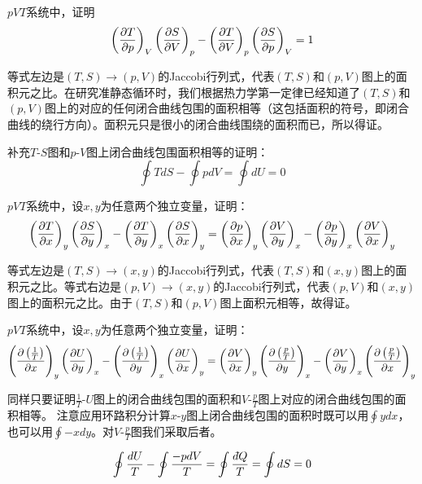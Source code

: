 \documentclass[CJK]{beamer}
\begin{document}
\begin{frame}
  \bch
  $pVT$系统中，证明
  $$ \left(\frac{\partial T}{\partial p}\right)_{V} \left(\frac{\partial S}{\partial V}\right)_{p} - \left(\frac{\partial T}{\partial V}\right)_{p} \left(\frac{\partial S}{\partial p}\right)_{V} = 1 $$
  \ech
\end{frame}

\begin{frame}
  \bch
  等式左边是$(T,S)\rightarrow (p, V)$的Jaccobi行列式，代表$(T,S)$和$(p,V)$图上的面积元之比。在研究准静态循环时，我们根据热力学第一定律已经知道了$(T,S)$和$(p,V)$图上的对应的任何闭合曲线包围的面积相等（这包括面积的符号，即闭合曲线的绕行方向）。面积元只是很小的闭合曲线围绕的面积而已，所以得证。

  \skipline

  补充$T$-$S$图和$p$-$V$图上闭合曲线包围面积相等的证明：
$$ \oint TdS - \oint pdV = \oint dU = 0$$
  
  \ech
\end{frame}


\begin{frame}
  \bch
  $pVT$系统中，设$x, y$为任意两个独立变量，证明：
      {\small $$ \left(\frac{\partial T}{\partial x}\right)_{y} \left(\frac{\partial S}{\partial y}\right)_{x} - \left(\frac{\partial T}{\partial y}\right)_{x} \left(\frac{\partial S}{\partial x}\right)_{y} = \left(\frac{\partial p}{\partial x}\right)_{y} \left(\frac{\partial V}{\partial y}\right)_{x} - \left(\frac{\partial p}{\partial y}\right)_{x} \left(\frac{\partial V}{\partial x}\right)_{y} $$}  
  \ech
\end{frame}


\begin{frame}
  \bch
等式左边是$(T,S)\rightarrow (x, y)$的Jaccobi行列式，代表$(T,S)$和$(x,y)$图上的面积元之比。等式右边是$(p,V)\rightarrow (x, y)$的Jaccobi行列式，代表$(p,V)$和$(x,y)$图上的面积元之比。由于$(T,S)$和$(p,V)$图上面积元相等，故得证。
  \ech
\end{frame}

\begin{frame}
  \bch
  $pVT$系统中，设$x, y$为任意两个独立变量，证明：
      {\scriptsize $$ \left(\frac{\partial \left(\frac{1}{T}\right)}{\partial x}\right)_{y} \left(\frac{\partial U}{\partial y}\right)_{x} - \left(\frac{\partial \left(\frac{1}{T}\right)}{\partial y}\right)_{x} \left(\frac{\partial U}{\partial x}\right)_{y} = \left(\frac{\partial V}{\partial x}\right)_{y} \left(\frac{\partial \left(\frac{p}{T}\right)}{\partial y}\right)_{x} - \left(\frac{\partial V}{\partial y}\right)_{x} \left(\frac{\partial \left(\frac{p}{T}\right)}{\partial x}\right)_{y} $$}  
  \ech
\end{frame}

\begin{frame}
  \bch
  同样只要证明$\frac{1}{T}$-$U$图上的闭合曲线包围的面积和$V$-$\frac{p}{T}$图上对应的闭合曲线包围的面积相等。
  注意应用环路积分计算$x$-$y$图上闭合曲线包围的面积时既可以用$\oint ydx$，也可以用$\oint -x dy$。对$V$-$\frac{p}{T}$图我们采取后者。
  
  $$\oint \frac{dU}{T} - \oint \frac{-pdV}{T} = \oint \frac{\dbar Q}{T} = \oint dS = 0$$
  
  \ech
\end{frame}
\end{document}
